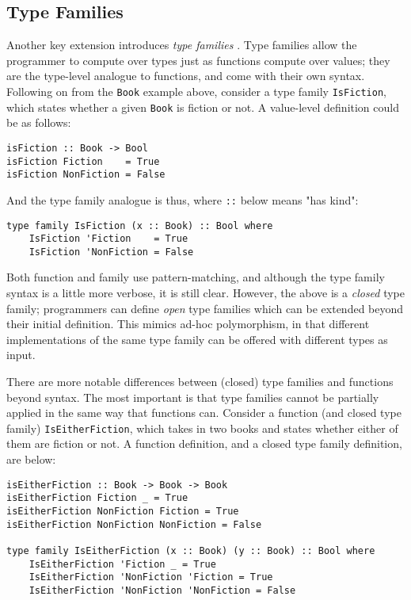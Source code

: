 \documentclass[12pt, a4paper, bibliography=totocnumbered]{scrreprt}
\newcommand{\inline}[1]{\lstinline[basicstyle=\ttfamily\footnotesize]{#1}}
\begin{document}
\subsection{Type Families}

Another key extension introduces \emph{type families} \cite{opentfs} \cite{closedtfs}. Type families allow the programmer to compute over types just as functions compute over values; they are the type-level analogue to functions, and come with their own syntax. Following on from the \inline{Book} example above, consider a type family \inline{IsFiction}, which states whether a given \inline{Book} is fiction or not. A value-level definition could be as follows:

\begin{lstlisting}
isFiction :: Book -> Bool
isFiction Fiction    = True
isFiction NonFiction = False
\end{lstlisting}

And the type family analogue is thus, where \inline{::} below means "has kind":

\begin{lstlisting}
type family IsFiction (x :: Book) :: Bool where
    IsFiction 'Fiction    = True
    IsFiction 'NonFiction = False
\end{lstlisting}

Both function and family use pattern-matching, and although the type family syntax is a little more verbose, it is still clear. However, the above is a \emph{closed} type family; programmers can define \emph{open} type families which can be extended beyond their initial definition. This mimics ad-hoc polymorphism, in that different implementations of the same type family can be offered with different types as input.

There are more notable differences between (closed) type families and functions beyond syntax. The most important is that type families cannot be partially applied in the same way that functions can. Consider a function (and closed type family) \inline{IsEitherFiction}, which takes in two books and states whether either of them are fiction or not. A function definition, and a closed type family definition, are below:

\begin{lstlisting}
isEitherFiction :: Book -> Book -> Book
isEitherFiction Fiction _ = True
isEitherFiction NonFiction Fiction = True
isEitherFiction NonFiction NonFiction = False

type family IsEitherFiction (x :: Book) (y :: Book) :: Bool where
    IsEitherFiction 'Fiction _ = True
    IsEitherFiction 'NonFiction 'Fiction = True
    IsEitherFiction 'NonFiction 'NonFiction = False
\end{lstlisting}
\end{document}
